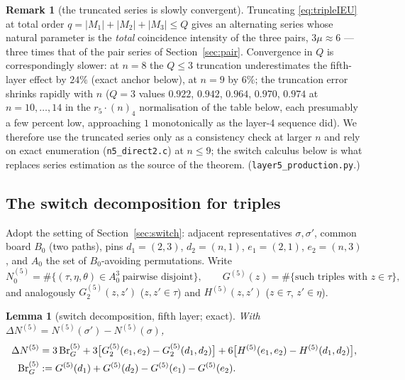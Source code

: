 \documentclass[11pt]{article}
\newtheorem{lemma}[theorem]{Lemma}
\theoremstyle{definition}
\newtheorem{remark}[theorem]{Remark}
\begin{document}
\begin{remark}[the truncated series is slowly convergent]
Truncating \eqref{eq:tripleIEU} at total order
$q=|M_1|+|M_2|+|M_3|\le Q$ gives an alternating series whose natural
parameter is the \emph{total} coincidence intensity of the three pairs,
$3\mu\approx6$ --- three times that of the pair series of
Section~\ref{sec:pair}.  Convergence in $Q$ is correspondingly slower:
at $n=8$ the $Q\le3$ truncation underestimates the fifth-layer effect
by $24\%$ (exact anchor below), at $n=9$ by $6\%$; the truncation error
shrinks rapidly with $n$ ($Q=3$ values $0.922$, $0.942$, $0.964$,
$0.970$, $0.974$ at $n=10,\dots,14$ in
the $r_5\cdot(n)_4$ normalisation of the table below, each presumably a
few percent low, approaching $1$ monotonically as the layer-4 sequence
did).  We therefore use the truncated series only as a
consistency check at larger $n$ and rely on exact enumeration
(\texttt{n5\_direct2.c}) at $n\le9$; the switch calculus below is what
replaces series estimation as the source of the theorem.
(\texttt{layer5\_production.py}.)
\end{remark}

\subsection{The switch decomposition for triples}

Adopt the setting of Section~\ref{sec:switch}: adjacent representatives
$\sigma,\sigma'$, common board $B_0$ (two paths), pins
$d_1=(2,3)$, $d_2=(n,1)$, $e_1=(2,1)$, $e_2=(n,3)$, and $A_0$ the set of
$B_0$-avoiding permutations.  Write
\[
N^{(5)}_0=\#\{(\tau,\eta,\theta)\in A_0^3\ \text{pairwise disjoint}\},
\qquad
G^{(5)}(z)=\#\{\text{such triples with }z\in\tau\},
\]
and analogously $G_2^{(5)}(z,z')$ ($z,z'\in\tau$) and $H^{(5)}(z,z')$
($z\in\tau$, $z'\in\eta$).

\begin{lemma}[switch decomposition, fifth layer; exact]\label{lem:switchIE5}
With $\Delta N^{(5)}=N^{(5)}(\sigma')-N^{(5)}(\sigma)$,
\begin{align}
\Delta N^{(5)}
&=3\,\mathrm{Br}^{(5)}_G
+3\bigl[G_2^{(5)}(e_1,e_2)-G_2^{(5)}(d_1,d_2)\bigr]
+6\bigl[H^{(5)}(e_1,e_2)-H^{(5)}(d_1,d_2)\bigr],
\label{eq:switchIE5}\\
\mathrm{Br}^{(5)}_G&:=G^{(5)}(d_1)+G^{(5)}(d_2)-G^{(5)}(e_1)-G^{(5)}(e_2).
\notag
\end{align}
\end{lemma}
\end{document}
